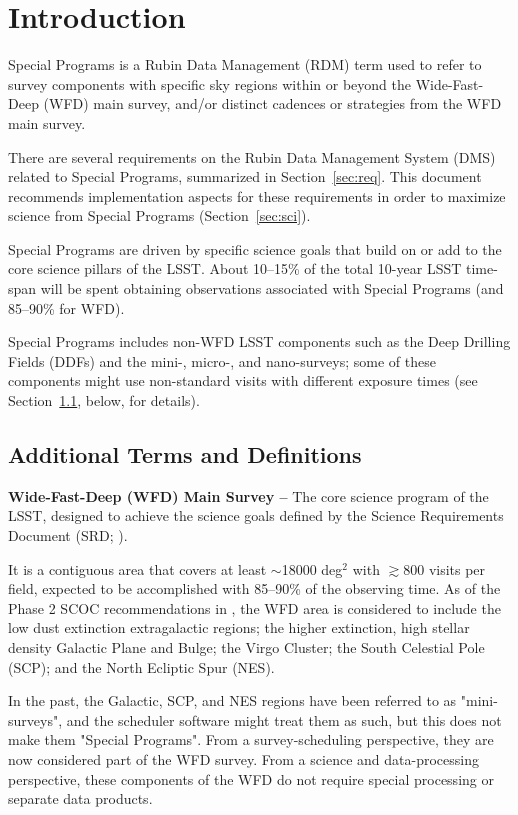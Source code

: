 \section{Introduction} \label{sec:intro}

Special Programs is a Rubin Data Management (RDM) term used to refer to survey 
components with specific sky regions within or beyond the 
Wide-Fast-Deep (WFD) main survey, and/or distinct cadences or 
strategies from the WFD main survey.

There are several requirements on the Rubin Data Management System (DMS) 
related to Special Programs, summarized in Section~\ref{sec:req}.
This document recommends implementation aspects for these requirements in order to 
maximize science from Special Programs (Section~\ref{sec:sci}).

Special Programs are driven by specific science goals that build on or 
add to the core science pillars of the LSST.
About 10--15\% of the total 10-year LSST time-span will be spent obtaining 
observations associated with Special Programs (and 85--90\% for WFD).

Special Programs includes non-WFD LSST components such as the Deep Drilling 
Fields (DDFs) and the mini-, micro-, and nano-surveys; some of these components
might use non-standard visits with different exposure times
(see Section~\ref{ssec:intro_terms}, below, for details).


\subsection{Additional Terms and Definitions}\label{ssec:intro_terms}

\textbf{Wide-Fast-Deep (WFD) Main Survey -- }
The core science program of the LSST, designed to achieve the science 
goals defined by the Science Requirements Document (SRD; ).

It is a contiguous area that covers at least $\sim$18000 deg$^2$ with 
$\gtrsim$800 visits per field, expected to be accomplished with 85--90\% 
of the observing time.
As of the Phase 2 SCOC recommendations in , the WFD area 
is considered to include the low dust extinction extragalactic regions; 
the higher extinction, high stellar density Galactic Plane and Bulge; the 
Virgo Cluster; the South Celestial Pole (SCP); and the North Ecliptic Spur 
(NES). 

In the past, the Galactic, SCP, and NES regions have been referred to as 
"mini-surveys", and the scheduler software might treat them as such, but 
this does not make them "Special Programs". 
From a survey-scheduling perspective, they are now considered part of the 
WFD survey.
From a science and data-processing perspective, these components of the 
WFD do not require special processing or separate data products.


